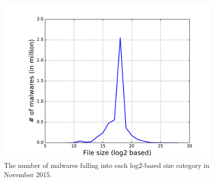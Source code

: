 \begin{figure}[!htb]
  \includegraphics[width=\linewidth]{figure/size}
{The number of malwares falling into each log2-based size category in November 2015.}
\endminipage\hfill

\vspace{-0.1in}
\end{figure}